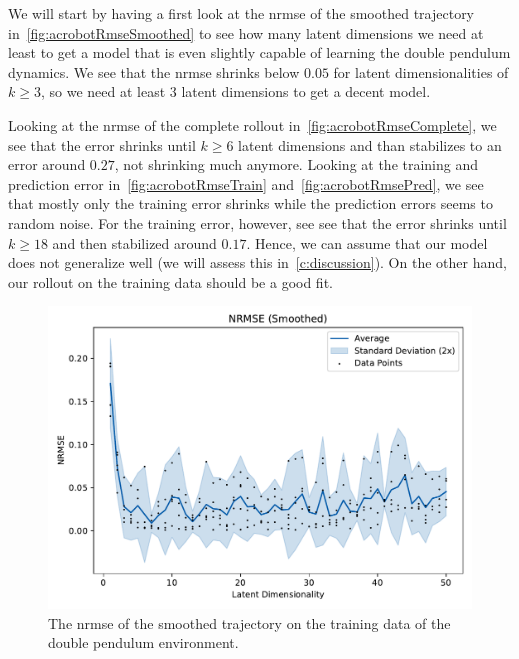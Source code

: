 			We will start by having a first look at the \ac{nrmse} of the smoothed trajectory in~\autoref{fig:acrobotRmseSmoothed} to see how many latent dimensions we need at least to get a model that is even slightly capable of learning the double pendulum dynamics. We see that the \ac{nrmse} shrinks below \(0.05\) for latent dimensionalities of \( k \geq 3 \), so we need at least \(3\) latent dimensions to get a decent model.

			Looking at the \ac{nrmse} of the complete rollout in~\autoref{fig:acrobotRmseComplete}, we see that the error shrinks until \( k \geq 6 \) latent dimensions and than stabilizes to an error around \( 0.27 \), not shrinking much anymore. Looking at the training and prediction error in~\autoref{fig:acrobotRmseTrain} and~\autoref{fig:acrobotRmsePred}, we see that mostly only the training error shrinks while the prediction errors seems to random noise. For the training error, however, see see that the error shrinks until \( k \geq 18 \) and then stabilized around \( 0.17 \). Hence, we can assume that our model does not generalize well (we will assess this in~\autoref{c:discussion}). On the other hand, our rollout on the training data should be a good fit.

			\begin{figure}
				\centering
				\includegraphics[width=0.7\linewidth]{figures/results/acrobot-gym/latent-dim/comparison-rmse-smoothed-normalized-mean-vs-latent-dim.pdf}
				\caption{The \ac{nrmse} of the smoothed trajectory on the training data of the double pendulum environment.}
				\label{fig:acrobotRmseSmoothed}
			\end{figure}

